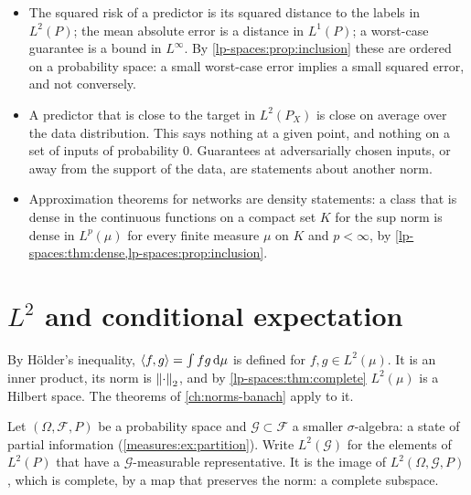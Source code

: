 \begin{notechapter}
\begin{mlthread}
\begin{itemize}[nosep]
  \item The squared risk of a predictor is its squared distance to the
        labels in $L^2(P)$; the mean absolute error is a distance in
        $L^1(P)$; a worst-case guarantee is a bound in $L^\infty$. By
        \cref{lp-spaces:prop:inclusion} these are ordered on a
        probability space: a small worst-case error implies a small
        squared error, and not conversely.
  \item A predictor that is close to the target in $L^2(P_X)$ is close
        on average over the data distribution. This says nothing at a
        given point, and nothing on a set of inputs of probability
        $0$. Guarantees at adversarially chosen inputs, or away from the
        support of the data, are statements about another norm.
  \item Approximation theorems for networks are density statements: a
        class that is dense in the continuous functions on a compact set
        $K$ for the sup norm is dense in $L^p(\mu)$ for every finite
        measure $\mu$ on $K$ and $p < \infty$, by
        \cref{lp-spaces:thm:dense,lp-spaces:prop:inclusion}.
\end{itemize}
\end{mlthread}

\section{$L^2$ and conditional expectation}\label{lp-spaces:sec:l2}

By H\"older's inequality, $\left\langle f, g \right\rangle = \int fg\,\mathrm{d}\mu$ is defined for
$f, g\in L^2(\mu)$. It is an inner product, its norm is
$\left\|\cdot\right\|_2$, and by \cref{lp-spaces:thm:complete} $L^2(\mu)$ is a
Hilbert space. The theorems of \cref{ch:norms-banach} apply to it.

Let $(\Omega, \mathcal F, P)$ be a probability space and
$\mathcal G\subset\mathcal F$ a smaller $\sigma$-algebra: a state of
partial information (\cref{measures:ex:partition}). Write
$L^2(\mathcal G)$ for the elements of $L^2(P)$ that have a
$\mathcal G$-measurable representative. It is the image of
$L^2(\Omega, \mathcal G, P)$, which is complete, by a map that preserves
the norm: a complete subspace.


\end{notechapter}
